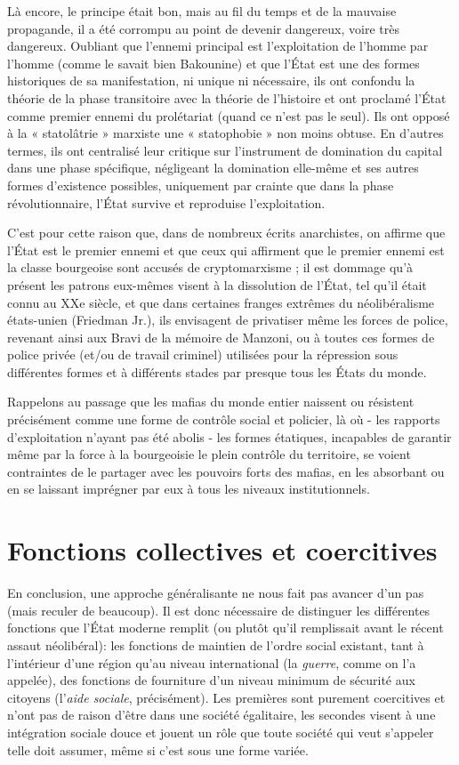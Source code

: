 Là encore, le principe était bon, mais au fil du temps et de la mauvaise propagande, il a été corrompu au point de devenir dangereux, voire très dangereux. Oubliant que l'ennemi principal est l'exploitation de l'homme par l'homme (comme le savait bien Bakounine) et que l'État est une des formes historiques de sa manifestation, ni unique ni nécessaire, ils ont confondu la théorie de la phase transitoire avec la théorie de l'histoire et ont proclamé l'État comme premier ennemi du prolétariat (quand ce n'est pas le seul). Ils ont opposé à la « statolâtrie » marxiste une « statophobie » non moins obtuse. En d'autres termes, ils ont centralisé leur critique sur l'instrument de domination du capital dans une phase spécifique, négligeant la domination elle-même et ses autres formes d'existence possibles, uniquement par crainte que dans la phase révolutionnaire, l'État survive et reproduise l'exploitation.

C'est pour cette raison que, dans de nombreux écrits anarchistes, on affirme que l'État est le premier ennemi et que ceux qui affirment que le premier ennemi est la classe bourgeoise sont accusés de cryptomarxisme ; il est dommage qu'à présent les patrons eux-mêmes visent à la dissolution de l'État, tel qu'il était connu au XXe siècle, et que dans certaines franges extrêmes du néolibéralisme états-unien (Friedman Jr.), ils envisagent de privatiser même les forces de police, revenant ainsi aux Bravi de la mémoire de Manzoni, ou à toutes ces formes de police privée (et/ou de travail criminel) utilisées pour la répression sous différentes formes et à différents stades par presque tous les États du monde.

Rappelons au passage que les mafias du monde entier naissent ou résistent précisément comme une forme de contrôle social et policier, là où - les rapports d'exploitation n'ayant pas été abolis - les formes étatiques, incapables de garantir même par la force à la bourgeoisie le plein contrôle du territoire, se voient contraintes de le partager avec les pouvoirs forts des mafias, en les absorbant ou en se laissant imprégner par eux à tous les niveaux institutionnels.

\section{Fonctions collectives et coercitives}

En conclusion, une approche généralisante ne nous fait pas avancer d'un pas (mais reculer de beaucoup). Il est donc nécessaire de distinguer les différentes fonctions que l'État moderne remplit (ou plutôt qu'il remplissait avant le récent assaut néolibéral): les fonctions de maintien de l'ordre social existant, tant à l'intérieur d'une région qu'au niveau international (la \emph{guerre}, comme on l'a appelée), des fonctions de fourniture d'un niveau minimum de sécurité aux citoyens (l'\emph{aide sociale}, précisément). Les premières sont purement coercitives et n'ont pas de raison d'être dans une société égalitaire, les secondes visent à une intégration sociale douce et jouent un rôle que toute société qui veut s'appeler telle doit assumer, même si c'est sous une forme variée.

